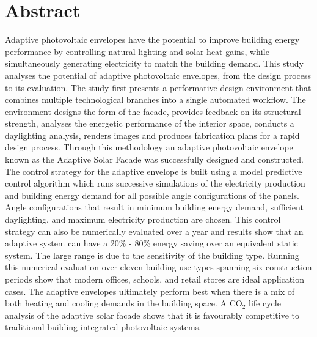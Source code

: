 \begingroup
\let\clearpage\relax
\let\cleardoublepage\relax
\let\cleardoublepage\relax

\chapter*{Abstract}

Adaptive photovoltaic envelopes have the potential to improve building energy performance by controlling natural lighting and solar heat gains, while simultaneously generating electricity to match the building demand. This study analyses the potential of adaptive photovoltaic envelopes, from the design process to its evaluation. The study first presents a performative design environment that combines multiple technological branches into a single automated workflow. The environment designs the form of the facade, provides feedback on its structural strength, analyses the energetic performance of the interior space, conducts a daylighting analysis, renders images and produces fabrication plans for a rapid design process. Through this methodology an adaptive photovoltaic envelope known as the Adaptive Solar Facade was successfully designed and constructed. The control strategy for the adaptive envelope is built using a model predictive control algorithm which runs successive simulations of the electricity production and building energy demand for all possible angle configurations of the panels. Angle configurations that result in minimum building energy demand, sufficient daylighting, and maximum electricity production are chosen. This control strategy can also be numerically evaluated over a year and results show that an adaptive system can have a 20\% - 80\% energy saving over an equivalent static system. The large range is due to the sensitivity of the building type. Running this numerical evaluation over eleven building use types spanning six construction periods show that modern offices, schools, and retail stores are ideal application cases. The adaptive envelopes ultimately perform best when there is a mix of both heating and cooling demands in the building space. A CO$_2$ life cycle analysis of the adaptive solar facade shows that it is favourably competitive to traditional building integrated photovoltaic systems.

\endgroup

\cleardoublepage%

